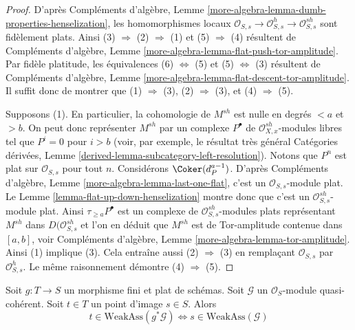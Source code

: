 \begin{proof}
D'après Compléments d'algèbre, Lemme
\ref{more-algebra-lemma-dumb-properties-henselization},
les homomorphismes locaux
$\mathcal{O}_{S, s} \to \mathcal{O}_{S, s}^h \to \mathcal{O}_{S, s}^{sh}$
sont fidèlement plats.
Ainsi (3) $\Rightarrow$ (2) $\Rightarrow$ (1) et
(5) $\Rightarrow$ (4) résultent de
Compléments d'algèbre, Lemme \ref{more-algebra-lemma-flat-push-tor-amplitude}.
Par fidèle platitude, les équivalences (6) $\Leftrightarrow$ (5) et
(5) $\Leftrightarrow$ (3) résultent de
Compléments d'algèbre, Lemme \ref{more-algebra-lemma-flat-descent-tor-amplitude}.
Il suffit donc de montrer que
(1) $\Rightarrow$ (3), (2) $\Rightarrow$ (3), et (4) $\Rightarrow$ (5).

\medskip\noindent
Supposons (1). En particulier, la cohomologie de $M^{sh}$ est nulle
en degrés $< a$ et $> b$. On peut donc représenter $M^{sh}$ par un complexe
$P^\bullet$ de $\mathcal{O}_{X, x}^{sh}$-modules libres tel que
$P^i = 0$ pour $i > b$
(voir, par exemple, le résultat très général
Catégories dérivées, Lemme \ref{derived-lemma-subcategory-left-resolution}).
Notons que $P^n$ est plat sur $\mathcal{O}_{S, s}$ pour tout $n$.
Considérons $\Coker(d_P^{a - 1})$. D'après Compléments d'algèbre, Lemme
\ref{more-algebra-lemma-last-one-flat},
c'est un $\mathcal{O}_{S, s}$-module plat.
Le Lemme \ref{lemma-flat-up-down-henselization} montre donc que
c'est un $\mathcal{O}_{S, s}^{sh}$-module plat.
Ainsi $\tau_{\geq a}P^\bullet$ est un complexe de
$\mathcal{O}_{S, s}^{sh}$-modules plats représentant $M^{sh}$
dans $D(\mathcal{O}_{S, s}^{sh}$ et l'on en déduit que
$M^{sh}$ est de Tor-amplitude contenue dans $[a, b]$, voir
Compléments d'algèbre, Lemme \ref{more-algebra-lemma-tor-amplitude}.
Ainsi (1) implique (3). Cela entraîne aussi
(2) $\Rightarrow$ (3) en remplaçant $\mathcal{O}_{S, s}$ par
$\mathcal{O}_{S, s}^h$. Le même raisonnement démontre
(4) $\Rightarrow$ (5).
\end{proof}

\begin{lemma}
\label{lemma-finite-flat-weak-assassin-up-down}
Soit $g : T \to S$ un morphisme fini et plat de schémas.
Soit $\mathcal{G}$ un $\mathcal{O}_S$-module quasi-cohérent.
Soit $t \in T$ un point d'image $s \in S$. Alors
$$
t \in \text{WeakAss}(g^*\mathcal{G})
\Leftrightarrow
s \in \text{WeakAss}(\mathcal{G})
$$
\end{lemma}

